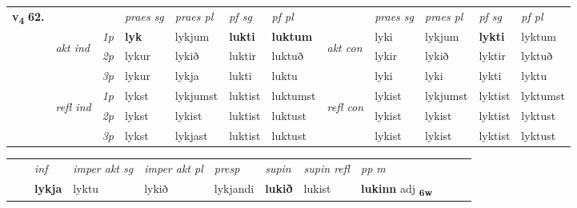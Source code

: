 \begin{tabular}{llllllllllll} \toprule
\multirow{4}{*}{{{\textbf{v{\textsubscript{4}}} \Large{\textbf{62.}}}}}  & &   &  \textit{praes sg}  & \textit{praes pl}  &\textit{ pf sg} & \textit{pf pl} &  &  \textit{praes sg}  & \textit{praes pl}  & \textit{pf sg} & \textit{pf pl } \\*
	\cmidrule{4-7} \cmidrule{9-12}
 & \multirow{3}{*}{\begin{turn}{90}\textit{akt ind}\end{turn}} & {\textit{1p}} & \textbf{lyk} & lykjum    & \textbf{lukti} & \textbf{luktum} & \multirow{3}{*}{\begin{turn}{90}\textit{akt con}\end{turn}} &lyki & lykjum & \textbf{lykti} & lyktum\\*
& &  {\textit{2p}} &  lykur  & lykið   & luktir & luktuð & & lykir & lykið & lyktir & lyktuð \\*
& &  {\textit{3p}} & lykur & lykja   & lukti & luktu & & lyki & lyki& lykti & lyktu  \\*
\cmidrule{4-7} \cmidrule{9-12}
 &\multirow{3}{*}{\begin{turn}{90}\textit{refl ind}\end{turn}} & {\textit{1p}} & lykst & lykjumst    & luktist & luktumst & \multirow{3}{*}{\begin{turn}{90}\textit{refl con}\end{turn}}  &lykist & lykjumst & lyktist & lyktumst\\*
 &&  {\textit{2p}} &  lykst  & lykist   & luktist & luktust & &lykist & lykist & lyktist & lyktust \\*
& &  {\textit{3p}} & lykst & lykjast   & luktist & luktust & & lykist & lykist& lyktist & lyktust  \\*
\cmidrule{4-7} \cmidrule{9-12}
\end{tabular}


\begin{tabular}{llllllllllll}
 & & \textit{inf} & \textit{imper akt sg} & \textit{imper akt pl}   & \textit{presp} & \textit{supin} & \textit{supin refl} & \textit{pp m}     \\*
  & & \textbf{lykja} & lyktu  & lykið   & lykjandi &  \textbf{lukið} & lukist & \textbf{lukinn} adj \textbf{\textsubscript{6w}} \\*
\cmidrule{1-12}
\end{tabular}



